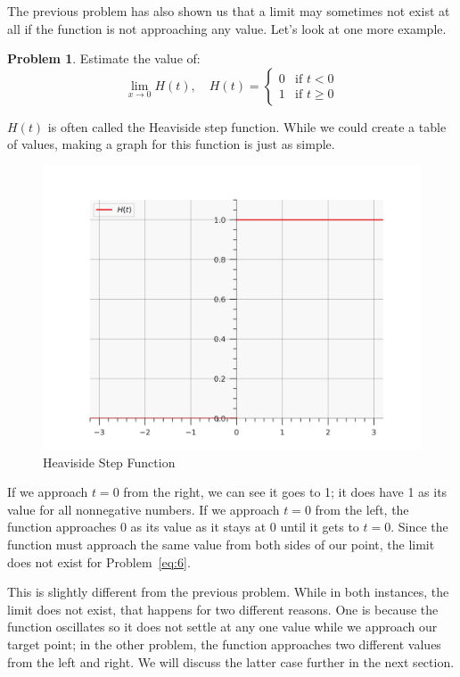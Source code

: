 \documentclass[12pt]{article}
\theoremstyle{definition}
\newtheorem{problem}{Problem}
\begin{document}
The previous problem has also shown us that a limit may sometimes not exist at all if the function is not approaching any value.
Let's look at one more example.

\begin{problem}
Estimate the value of:
\begin{equation*}
    \lim_{x \to 0} H(t), \quad H(t) =
    \begin{cases}
        0 & \text{if } t < 0    \\
        1 & \text{if } t \geq 0
    \end{cases} \label{eq:6}
\end{equation*}
\end{problem}

$H(t)$ is often called the Heaviside step function.
While we could create a table of values, making a graph for this function is just as simple.

\begin{figure}[H]
    \centering
    \includegraphics[width=12.5cm, keepaspectratio]{limits_4.png}
    \caption{Heaviside Step Function}
    \label{fig:fig4}
\end{figure}

If we approach $t=0$ from the right, we can see it goes to 1; it does have 1 as its value for all nonnegative numbers.
If we approach $t=0$ from the left, the function approaches 0 as its value as it stays at 0 until it gets to $t=0$.
Since the function must approach the same value from both sides of our point, the limit does not exist for Problem~\eqref{eq:6}.

This is slightly different from the previous problem.
While in both instances, the limit does not exist, that happens for two different reasons.
One is because the function oscillates so it does not settle at any one value while we approach our target point; in the other problem, the function approaches two different values from the left and right.
We will discuss the latter case further in the next section.
\end{document}
